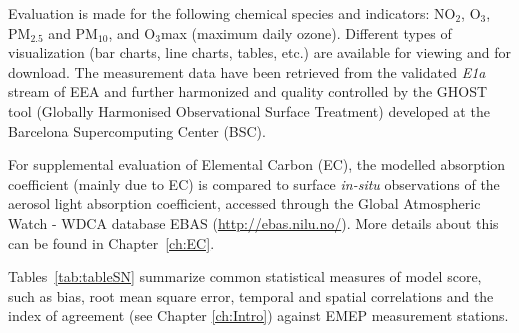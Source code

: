 Evaluation is made for the following chemical species and indicators:
NO$_{2}$, O$_{3}$, PM$_{2.5}$ and PM$_{10}$, and O$_{3}$max (maximum daily
ozone).
Different types of visualization (bar charts, line charts, tables,
etc.) are available for viewing and for download. The measurement data
have been retrieved from the validated {\em E1a} stream of EEA and further
harmonized and quality controlled by the GHOST tool (Globally Harmonised
Observational Surface Treatment) developed at the Barcelona Supercomputing
Center (BSC).

For supplemental evaluation of Elemental Carbon (EC), the modelled
absorption coefficient (mainly due to EC) is compared to surface \textit{in-situ}
observations of the aerosol light absorption coefficient, accessed through
the Global Atmospheric Watch - WDCA database EBAS
(\url{http://ebas.nilu.no/}). More details about this can be found in Chapter~\ref{ch:EC}.

\vspace{1cm}

Tables~\ref{tab:tableSN} summarize common statistical measures of model score, such as bias, root mean square error, temporal and spatial correlations and the index of agreement (see Chapter \ref{ch:Intro}) against EMEP measurement stations.

